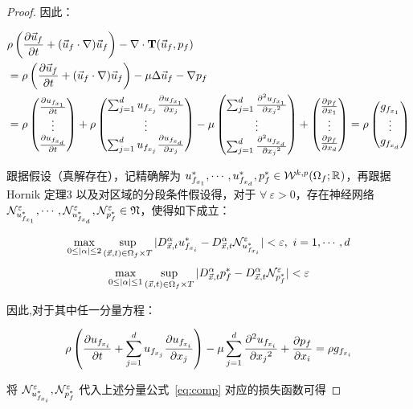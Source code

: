 \begin{proof}
因此：

\begin{equation}
\begin{aligned}
& \rho \left(\toD{\Uf}{t} + (\Uf \cdot \gradOp) \Uf \right) - \gradOp \cdot \opTf \\ 
&= \rho \left(\toD{\Uf}{t} + (\Uf \cdot \gradOp) \Uf \right) - \mu \laplaceOp \Uf - \gradOp \pf \\
& = \rho \tocolvec{\toD{\Ufi[1]}{t}}{\toD{\Ufi[d]}{t}} + \rho\tocolvec{\UfDotNablei[1]{\Ufi}}{\UfDotNablei[d]{\Ufi}} - \mu \tocolvec{
        \sum_{j=1}^{d} \toDsqua{\Ufi[1]}{x_j}
    }{
        \sum_{j=1}^{d} \toDsqua{\Ufi[d]}{x_j}
    } + \tocolvec{\toD{\pf}{x_1}}{\toD{\pf}{x_d}} = \rho \tocolvec{\gfi[1]}{\gfi[d]}
\end{aligned}
\end{equation}

\newcommand{\epsNN}[1]{\NN^\varepsilon_{#1}}

\newcommand{\tNNtUfi}[1][i]{\epsNN{\tUfi[#1]}}
\newcommand{\tNNtpf}{\epsNN{\tpf}}

跟据假设（真解存在），记精确解为 $\tUfi[1], \cdots, \tUfi[d], \tpf \in \Wkp{k}(\Of; \R)$，再跟据 Hornik\cite{hornik1991approximation} 定理3 以及对区域的分段条件假设得，对于 $\forall ~ \varepsilon > 0$，存在神经网络 $\tNNtUfi[1], \cdots, \tNNtUfi[d], \tNNtpf \in \NNset$，使得如下成立：

\newcommand{\honikEsti}[3]{
    \max_{0 \le |\alpha| \le #1} \sup_{(\vec{x},t) \in #2} |D_{\vec{x},t}^\alpha #3 - D_{\vec{x},t}^\alpha \epsNN{#3} | < \varepsilon
}
\begin{equation}\label{eq:honikEstiUfi}
    \honikEsti{2}{\Df}{\tUfi},~ i = 1, \cdots, d
\end{equation}
\begin{equation}\label{eq:honikEstipf}
    \honikEsti{1}{\Df}{\tpf}
\end{equation}

因此,对于其中任一分量方程：

\begin{equation}\label{eq:comp}
    \rho \left(\toD{\Ufi}{t} + \UfDotNablei{\Ufi}\right) - \mu \sum_{j=1}^{d} \toDsqua{\Ufi}{x_j} + \toD{\pf}{x_i} = \rho \gfi[i]
\end{equation}

将 $\tNNtUfi, \tNNtpf$ 代入上述分量公式~\eqref{eq:comp} 对应的损失函数可得

\newcommand{\partA}[1]{
    \toD{#1}{t}
}
\newcommand{\partB}[1]{
    \UfDotNablei{#1}
}
\newcommand{\partC}[1]{
    \toDsqua{#1}{x_j}
}
\newcommand{\partD}[1]{
    \toD{#1}{x_i}
}


\end{proof}
